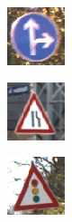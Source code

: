 \begin{figure}
\begin{subfigure}{.19\linewidth}
\end{subfigure}
\begin{subfigure}{.19\linewidth}
\includegraphics[width=0.7\linewidth]{imgs/missing/00001_00027}
\end{subfigure}
\begin{subfigure}{.19\linewidth}
\includegraphics[width=0.7\linewidth]{imgs/missing/00001_00026}
\end{subfigure}
\begin{subfigure}{.19\linewidth}
\includegraphics[width=0.7\linewidth]{imgs/missing/00003_00021}

\end{subfigure}
\end{figure}

